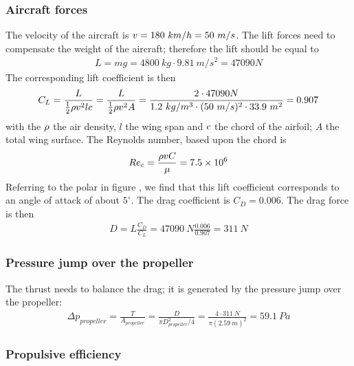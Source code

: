 \subsubsection*{Aircraft forces}

The velocity of the aircraft is $v = 180~km/h = 50~m/s$. The lift
forces need to compensate the weight of the aircraft; therefore the
lift should be equal to
\begin{align*}
  L = m g = 4800~kg \cdot 9.81~m/s^2 = 47090 N
\end{align*}
The corresponding lift coefficient is then 
\begin{align*}
  C_L = \frac{L}{\frac{1}{2} \rho v^2 l c}
  = \frac{L}{\frac{1}{2} \rho v^2 A} 
  = \frac{2 \cdot 47090 N}{1.2~kg/m^3 \cdot (50~m/s)^2 \cdot
    33.9~m^2} = 0.907
\end{align*}
with the $\rho$ the air density, $l$ the wing span and $c$ the
chord of the airfoil; $A$ the total wing surface. The Reynolds number,
based upon the chord is
\begin{align*}
  Re_c = \frac{\rho v C}{\mu} = 7.5 \times 10^6
\end{align*}
Referring to the polar in figure \label{fig:naca4412}, we find that
this lift coefficient corresponds to an angle of attack of about
$5^\circ$. The drag coefficient is $C_D = 0.006$. The drag force is
then
\begin{align*}
  D = L \frac{C_D}{C_L} = 47090~N \frac{0.006}{0.907} = 311~N
\end{align*}

\subsubsection*{Pressure jump over the propeller}

The thrust needs to balance the drag; it is generated by the pressure
jump over the propeller:
\begin{align*}
  \Delta p_{propeller} 
  = \frac{T}{A_{propeller}} 
  = \frac{D}{\pi D^2_{propeller}/4} 
  = \frac{4 \cdot 311~N}{\pi (2.59~m)^2} 
  = 59.1~Pa
\end{align*}

\subsubsection*{Propulsive efficiency}

